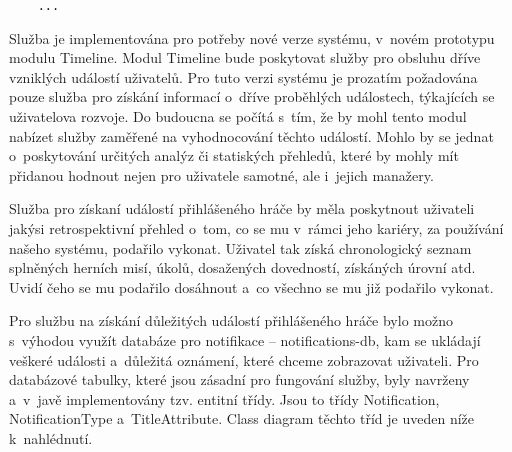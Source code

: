 \documentclass[twoside, 12pt]{article}
\begin{document}
{\begin{lstlisting}
    ...

\end{lstlisting}

\clearpage


Služba je implementována pro potřeby nové verze systému, v~novém prototypu modulu Timeline.
Modul Timeline bude poskytovat služby pro obsluhu dříve vzniklých událostí uživatelů.
Pro tuto verzi systému je prozatím požadována pouze služba pro získání informací o~dříve
proběhlých událostech, týkajících se uživatelova rozvoje.
Do budoucna se počítá s~tím, že by mohl tento modul nabízet služby zaměřené na vyhodnocování těchto událostí.
Mohlo by se jednat o~poskytování určitých analýz či statiských přehledů,
které by mohly mít přidanou hodnout nejen pro uživatele samotné, ale i~jejich manažery.

Služba pro získaní událostí přihlášeného hráče by měla poskytnout
uživateli jakýsi retrospektivní přehled o~tom,
co se mu v~rámci jeho kariéry, za používání našeho systému, podařilo vykonat.
Uživatel tak získá chronologický seznam splněných herních misí, úkolů,
dosažených dovedností, získáných úrovní atd.
Uvidí čeho se mu podařilo dosáhnout a~co všechno se mu již podařilo vykonat.


Pro službu na získání důležitých událostí přihlášeného hráče
bylo možno s~výhodou využít databáze pro notifikace -- notifications-db,
kam se ukládají veškeré události a~důležitá oznámení, které chceme zobrazovat uživateli.
Pro databázové tabulky, které jsou zásadní pro fungování služby, byly navrženy a~v~javě implementovány tzv. entitní třídy.
Jsou to třídy Notification, NotificationType a~TitleAttribute.
Class diagram těchto tříd je uveden níže k~nahlédnutí.


\clearpage

\obrazek
{}

}
\end{document}
